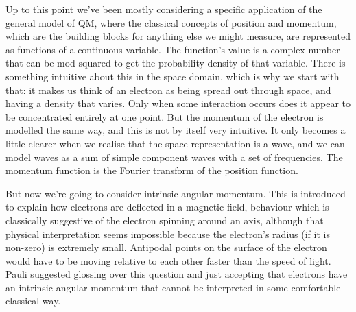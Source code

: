 Up to this point we've been mostly considering a specific application of the general model of QM, where the classical concepts of position and momentum, which are the building blocks for anything else we might measure, are represented as functions of a continuous variable. The function's value is a complex number that can be mod-squared to get the probability density of that variable. There is something intuitive about this in the space domain, which is why we start with that: it makes us think of an electron as being spread out through space, and having a density that varies. Only when some interaction occurs does it appear to be concentrated entirely at one point. But the momentum of the electron is modelled the same way, and this is not by itself very intuitive. It only becomes a little clearer when we realise that the space representation is a wave, and we can model waves as a sum of simple component waves with a set of frequencies. The momentum function is the Fourier transform of the position function.

But now we're going to consider intrinsic angular momentum. This is introduced to explain how electrons are deflected in a magnetic field, behaviour which is classically suggestive of the electron spinning around an axis, although that physical interpretation seems impossible because the electron's radius (if it is non-zero) is extremely small. Antipodal points on the surface of the electron would have to be moving relative to each other faster than the speed of light. Pauli suggested glossing over this question and just accepting that electrons have an intrinsic angular momentum that cannot be interpreted in some comfortable classical way.

